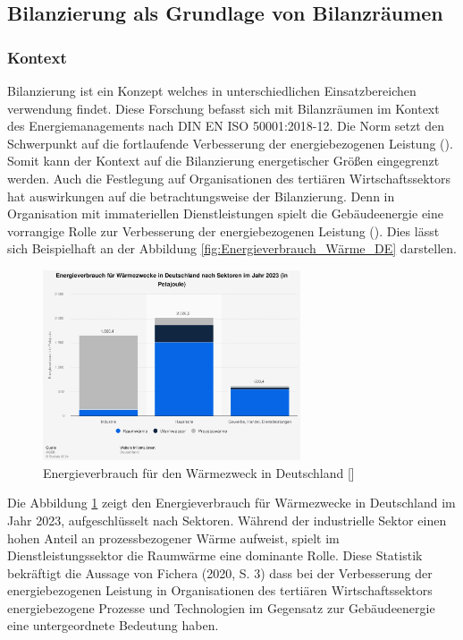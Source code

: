 \subsection{Bilanzierung als Grundlage von Bilanzräumen}

\subsubsection{Kontext}

Bilanzierung ist ein Konzept welches in unterschiedlichen Einsatzbereichen verwendung findet. Diese Forschung befasst sich mit Bilanzräumen 
im Kontext des Energiemanagements nach DIN EN ISO 50001:2018-12. Die Norm setzt den Schwerpunkt auf die fortlaufende Verbesserung der energiebezogenen Leistung 
(\cite[Kapitel 0.2]{DIN50001.2018}). Somit kann der Kontext auf die Bilanzierung energetischer Größen eingegrenzt werden.
Auch die Festlegung auf Organisationen des tertiären Wirtschaftssektors hat auswirkungen auf die betrachtungsweise der Bilanzierung. 
Denn in Organisation mit immateriellen Dienstleistungen spielt die Gebäudeenergie eine vorrangige Rolle zur Verbesserung der energiebezogenen 
Leistung (\cite[S. 3]{Fichera.2020}). 
Dies lässt sich Beispielhaft an der Abbildung \eqref{fig:Energieverbrauch_Wärme_DE} darstellen.

\begin{figure}[H]
    \centering
    \includegraphics[width=0.68\textwidth]{../../Ressourcen/Abbildungen/Energieverbrauch_für_Wärmezweck_DE.jpg}
    \caption{Energieverbrauch für den Wärmezweck in Deutschland [\cite{AGEB.2024}]}
    \label{fig:Energieverbrauch_Wärme_DE}
\end{figure}

Die Abbildung \ref{fig:Energieverbrauch_Wärme_DE} zeigt den Energieverbrauch für Wärmezwecke in Deutschland im Jahr 2023, aufgeschlüsselt nach Sektoren. 
Während der industrielle Sektor einen hohen Anteil an prozessbezogener Wärme aufweist, spielt im Dienstleistungssektor die Raumwärme 
eine dominante Rolle.
Diese Statistik bekräftigt die Aussage von Fichera (2020, S. 3) dass bei der Verbesserung der energiebezogenen Leistung in Organisationen des tertiären 
Wirtschaftssektors energiebezogene Prozesse und Technologien im Gegensatz zur Gebäudeenergie eine untergeordnete Bedeutung haben. 

